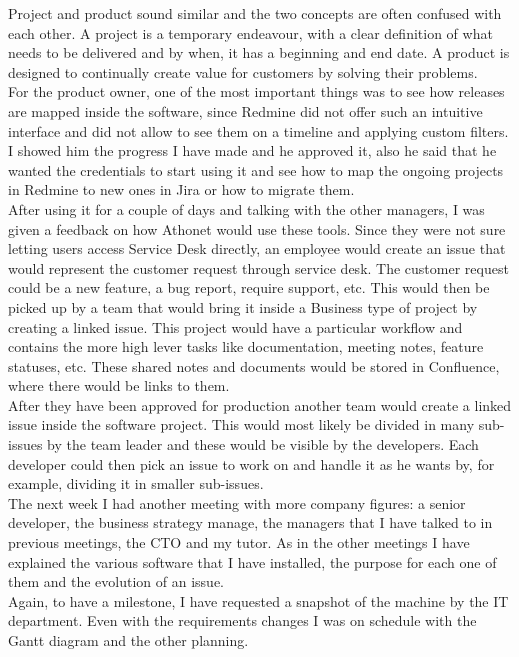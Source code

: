 	Project and product sound similar and the two concepts are often confused with each other.
	A project is a temporary endeavour, with a clear definition of what needs to be delivered and by when, it has a beginning and end date.
	A product is designed to continually create value for customers by solving their problems.\\
	For the product owner, one of the most important things was to see how releases are mapped inside the software, since Redmine did not offer such an intuitive interface and did not allow to see them on a timeline and applying custom filters.
	I showed him the progress I have made and he approved it, also he said that he wanted the credentials to start using it and see how to map the ongoing projects in Redmine to new ones in Jira or how to migrate them.\\
	After using it for a couple of days and talking with the other managers, I was given a feedback on how Athonet would use these tools.
	Since they were not sure letting users access Service Desk directly, an employee would create an issue that would represent the customer request through service desk.
	The customer request could be a new feature, a bug report, require support, etc.
	This would then be picked up by a team that would bring it inside a Business type of project by creating a linked issue.
	This project would have a particular workflow and contains the more high lever tasks like documentation, meeting notes, feature statuses, etc.
	These shared notes and documents would be stored in Confluence, where there would be links to them.\\
	After they have been approved for production another team would create a linked issue inside the software project.
	This would most likely be divided in many sub-issues by the team leader and these would be visible by the developers.
	Each developer could then pick an issue to work on and handle it as he wants by, for example, dividing it in smaller sub-issues.\\
	The next week I had another meeting with more company figures: a senior developer, the business strategy manage, the managers that I have talked to in previous meetings, the CTO and my tutor.
	As in the other meetings I have explained the various software that I have installed, the purpose for each one of them and the evolution of an issue.\\	
	Again, to have a milestone, I have requested a snapshot of the machine by the IT department.
	Even with the requirements changes I was on schedule with the Gantt diagram and the other planning.

